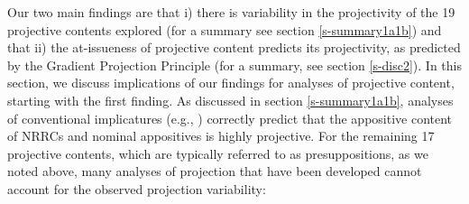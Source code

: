 \documentclass[11pt,fleqn]{article}
\newcommand{\6}{\mbox{$[\hspace*{-.6mm}[$}}
\newcommand{\9}{\mbox{$]\hspace*{-.6mm}]$}}
\begin{document}
Our two main findings are that i) there is variability in the projectivity of the 19 projective contents explored (for a summary see section \ref{s-summary1a1b}) and that ii) the at-issueness of projective content predicts its projectivity, as predicted by the Gradient Projection Principle (for a summary, see section \ref{s-disc2}). In this section, we discuss implications of our findings for analyses of projective content, starting with the first finding.  As discussed in section \ref{s-summary1a1b}, analyses of conventional implicatures (e.g., \citealt{potts05,murray2014,anderbois-etal2015}) correctly predict that the appositive content of NRRCs and nominal appositives is highly projective. For the remaining 17 projective contents, which are typically referred to as presuppositions, as we noted above, many analyses of projection that have been developed cannot account for the observed projection variability:
\end{document}

